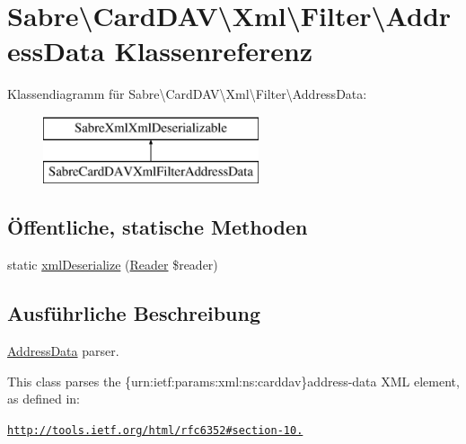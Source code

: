 \hypertarget{class_sabre_1_1_card_d_a_v_1_1_xml_1_1_filter_1_1_address_data}{}\section{Sabre\textbackslash{}Card\+D\+AV\textbackslash{}Xml\textbackslash{}Filter\textbackslash{}Address\+Data Klassenreferenz}
\label{class_sabre_1_1_card_d_a_v_1_1_xml_1_1_filter_1_1_address_data}
Klassendiagramm für Sabre\textbackslash{}Card\+D\+AV\textbackslash{}Xml\textbackslash{}Filter\textbackslash{}Address\+Data\+:\begin{figure}[H]
\begin{center}
\leavevmode
\includegraphics[height=2.000000cm]{class_sabre_1_1_card_d_a_v_1_1_xml_1_1_filter_1_1_address_data}
\end{center}
\end{figure}
\subsection*{Öffentliche, statische Methoden}
\begin{DoxyCompactItemize}
\item 
static \mbox{\hyperlink{class_sabre_1_1_card_d_a_v_1_1_xml_1_1_filter_1_1_address_data_aa2a94c5daaa13bd6710096bd24fe661e}{xml\+Deserialize}} (\mbox{\hyperlink{class_sabre_1_1_xml_1_1_reader}{Reader}} \$reader)
\end{DoxyCompactItemize}


\subsection{Ausführliche Beschreibung}
\mbox{\hyperlink{class_sabre_1_1_card_d_a_v_1_1_xml_1_1_filter_1_1_address_data}{Address\+Data}} parser.

This class parses the \{urn\+:ietf\+:params\+:xml\+:ns\+:carddav\}address-\/data X\+ML element, as defined in\+:

\href{http://tools.ietf.org/html/rfc6352#section-10.4}{\tt http\+://tools.\+ietf.\+org/html/rfc6352\#section-\/10.}

